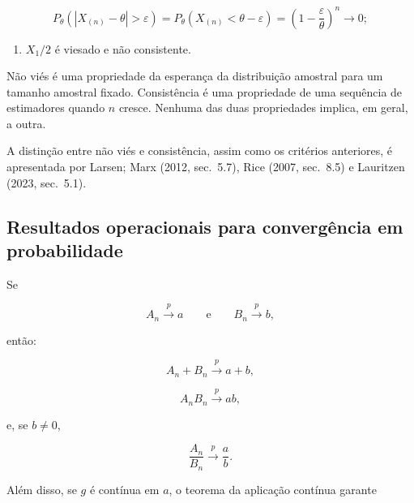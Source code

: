 \documentclass[
  letterpaper,
  DIV=11,
  numbers=noendperiod]{scrreprt}
\providecommand{\tightlist}{%
  \setlength{\itemsep}{0pt}\setlength{\parskip}{0pt}}\usepackage{longtable,booktabs,array}
\begin{document}
\[P_\theta\left(
|X_{(n)}-\theta|>\varepsilon
\right)
=
P_\theta\left(X_{(n)}<\theta-\varepsilon\right)
=
\left(1-\frac{\varepsilon}{\theta}\right)^n
\longrightarrow 0;\]

\begin{enumerate}
\def\labelenumi{\arabic{enumi}.}
\setcounter{enumi}{3}
\tightlist
\item
  \(X_1/2\) é viesado e não consistente.
\end{enumerate}

\begin{tcolorbox}[enhanced jigsaw, colback=white, leftrule=.75mm, colbacktitle=quarto-callout-note-color!10!white, breakable, titlerule=0mm, bottomtitle=1mm, title=\textcolor{quarto-callout-note-color}{\faInfo}\hspace{0.5em}{Interpretação}, colframe=quarto-callout-note-color-frame, toprule=.15mm, opacityback=0, bottomrule=.15mm, opacitybacktitle=0.6, arc=.35mm, toptitle=1mm, rightrule=.15mm, coltitle=black, left=2mm]

Não viés é uma propriedade da esperança da distribuição amostral para um
tamanho amostral fixado. Consistência é uma propriedade de uma sequência
de estimadores quando \(n\) cresce. Nenhuma das duas propriedades
implica, em geral, a outra.

\end{tcolorbox}

A distinção entre não viés e consistência, assim como os critérios
anteriores, é apresentada por Larsen; Marx (2012, sec.~5.7), Rice (2007,
sec.~8.5) e Lauritzen (2023, sec.~5.1).

\subsection*{Resultados operacionais para convergência em
probabilidade}\label{resultados-operacionais-para-converguxeancia-em-probabilidade}

Se

\[A_n\xrightarrow{p}a
\qquad\text{e}\qquad
B_n\xrightarrow{p}b,\]

então:

\[A_n+B_n\xrightarrow{p}a+b,\]

\[A_nB_n\xrightarrow{p}ab,\]

e, se \(b\neq0\),

\[\frac{A_n}{B_n}\xrightarrow{p}\frac{a}{b}.\]

Além disso, se \(g\) é contínua em \(a\), o teorema da aplicação
contínua garante
\end{document}
